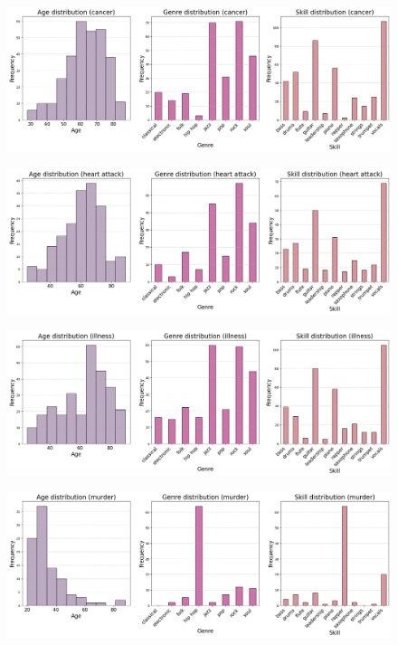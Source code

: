 \documentclass{article}
\begin{document}
\begin{figure}[H]
    \centering
    \includegraphics[width=1\linewidth]{graph_images/death_cause_analysis/cancer_distribution.png}
    \label{fig:enter-label}
\end{figure}

\begin{figure}[H]
    \centering
    \includegraphics[width=1\linewidth]{graph_images/death_cause_analysis/heart_attack_distribution.png}
    \label{fig:enter-label}
\end{figure}

\begin{figure}[H]
    \centering
    \includegraphics[width=1\linewidth]{graph_images/death_cause_analysis/illness_distribution.png}
    \label{fig:enter-label}
\end{figure}

\begin{figure}[H]
    \centering
    \includegraphics[width=1\linewidth]{graph_images/death_cause_analysis/murder_distribution.png}
    \label{fig:enter-label}
\end{figure}
\end{document}
